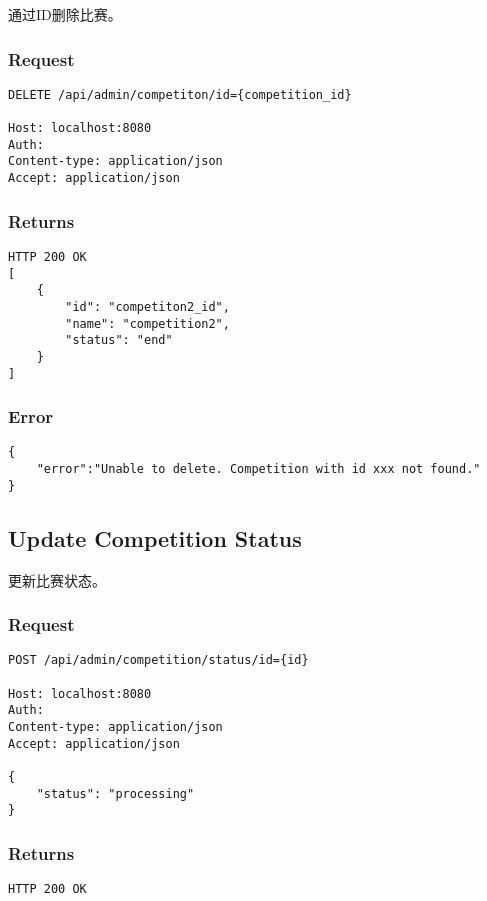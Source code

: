 \documentclass{article}
\begin{document}
通过ID删除比赛。

\subsubsection*{Request}
\begin{lstlisting}
DELETE /api/admin/competiton/id={competition_id}

Host: localhost:8080
Auth:
Content-type: application/json
Accept: application/json
\end{lstlisting}

\subsubsection*{Returns}
\begin{lstlisting}
HTTP 200 OK
[
	{
	    "id": "competiton2_id",
	    "name": "competition2",
	    "status": "end"
	}
]
\end{lstlisting}

\subsubsection*{Error}
\begin{lstlisting}
{
    "error":"Unable to delete. Competition with id xxx not found."
}
\end{lstlisting}

\subsection{Update Competition Status}

更新比赛状态。

\subsubsection*{Request}
\begin{lstlisting}
POST /api/admin/competition/status/id={id}

Host: localhost:8080
Auth:
Content-type: application/json
Accept: application/json

{
	"status": "processing"
}
\end{lstlisting}

\subsubsection*{Returns}
\begin{lstlisting}
HTTP 200 OK
\end{lstlisting}
\end{document}
